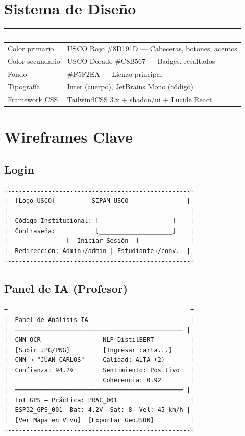 \documentclass[12pt,a4paper,twoside]{report}
\begin{document}
\section{Sistema de Diseño}
\begin{center}
\begin{tabularx}{\textwidth}{|l|X|}
\hline
\rowcolor{tableHdr}\textcolor{white}{\textbf{Elemento}} & \textcolor{white}{\textbf{Especificación}} \\
\hline
\rowcolor{rowOdd}Color primario & USCO Rojo \#8D191D — Cabeceras, botones, acentos \\
\hline\rowcolor{rowEven}Color secundario & USCO Dorado \#C8B567 — Badges, resaltados \\
\hline\rowcolor{rowOdd}Fondo & \#F5F2EA — Lienzo principal \\
\hline\rowcolor{rowEven}Tipografía & Inter (cuerpo), JetBrains Mono (código) \\
\hline\rowcolor{rowOdd}Framework CSS & TailwindCSS 3.x + shadcn/ui + Lucide React \\
\hline
\end{tabularx}
\end{center}

\section{Wireframes Clave}

\subsection{Login}
\begin{lstlisting}[caption={Mockup: Pantalla de Inicio de Sesión},numbers=none]
+--------------------------------------------------+
|  [Logo USCO]          SIPAM-USCO                |
|                                                  |
|  Código Institucional: [____________________]    |
|  Contraseña:           [____________________]    |
|                [  Iniciar Sesión  ]              |
|  Redirección: Admin→/admin | Estudiante→/conv.  |
+--------------------------------------------------+
\end{lstlisting}

\subsection{Panel de IA (Profesor)}
\begin{lstlisting}[caption={Mockup: Panel de Inteligencia Artificial},numbers=none]
+--------------------------------------------------+
|  Panel de Análisis IA                            |
|  ────────────────────────────────────────────── |
|  CNN OCR                 NLP DistilBERT          |
|  [Subir JPG/PNG]         [Ingresar carta...]     |
|  CNN → "JUAN CARLOS"     Calidad: ALTA (2)       |
|  Confianza: 94.2%        Sentimiento: Positivo   |
|                          Coherencia: 0.92        |
|  ────────────────────────────────────────────── |
|  IoT GPS — Práctica: PRAC_001                    |
|  ESP32_GPS_001  Bat: 4.2V  Sat: 8  Vel: 45 km/h |
|  [Ver Mapa en Vivo]  [Exportar GeoJSON]          |
+--------------------------------------------------+
\end{lstlisting}
\end{document}
